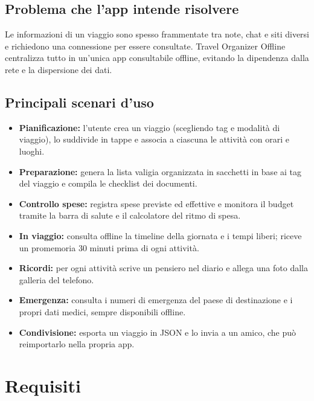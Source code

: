 \documentclass[11pt, a4paper]{article}
\begin{document}
\subsection{Problema che l'app intende risolvere}
Le informazioni di un viaggio sono spesso frammentate tra note, chat e siti
diversi e richiedono una connessione per essere consultate. Travel Organizer
Offline centralizza tutto in un'unica app consultabile offline, evitando la
dipendenza dalla rete e la dispersione dei dati.

\subsection{Principali scenari d'uso}
\begin{itemize}[noitemsep]
    \item \textbf{Pianificazione:} l'utente crea un viaggio (scegliendo tag e
    modalità di viaggio), lo suddivide in tappe e associa a ciascuna le attività
    con orari e luoghi.
    \item \textbf{Preparazione:} genera la lista valigia organizzata in
    sacchetti in base ai tag del viaggio e compila le checklist dei documenti.
    \item \textbf{Controllo spese:} registra spese previste ed effettive e
    monitora il budget tramite la barra di salute e il calcolatore del ritmo di
    spesa.
    \item \textbf{In viaggio:} consulta offline la timeline della giornata e i
    tempi liberi; riceve un promemoria 30 minuti prima di ogni attività.
    \item \textbf{Ricordi:} per ogni attività scrive un pensiero nel diario e
    allega una foto dalla galleria del telefono.
    \item \textbf{Emergenza:} consulta i numeri di emergenza del paese di
    destinazione e i propri dati medici, sempre disponibili offline.
    \item \textbf{Condivisione:} esporta un viaggio in JSON e lo invia a un
    amico, che può reimportarlo nella propria app.
\end{itemize}

\section{Requisiti}
\end{document}
